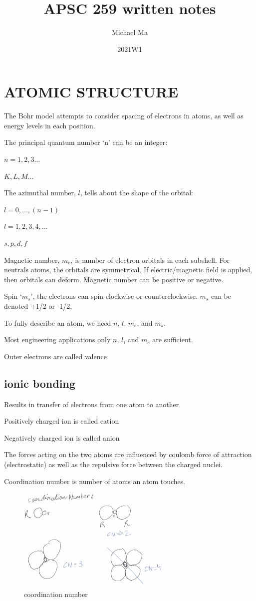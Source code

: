 \documentclass{article}
\title{APSC 259 written notes}
\author{Michael Ma}
\date{2021W1}
\begin{document}
\maketitle

\section{ATOMIC STRUCTURE}

The Bohr model attempts to consider spacing of electrons in atoms, as well as energy levels in each position.

The principal quantum number `n' can be an integer:

$n = 1, 2, 3 ...$
    
$    K, L, M ...$


The azimuthal number, $l$, tells about the shape of the orbital:

$l = 0, ..., (n-1)$

$l = 1, 2, 3, 4, ...$

$s, p, d, f$

Magnetic number, $m_e$, is number of electron orbitals in each subshell. For neutrals atoms, the orbitals are symmetrical. If electric/magnetic field is applied, then orbitals can deform. Magnetic number can be positive or negative.

Spin `$m_s$', the electrons can spin clockwise or counterclockwise. $m_s$ can be denoted +1/2 or -1/2. 

To fully describe an atom, we need $n$, $l$, $m_e$, and $m_s$.

Most engineering applications only $n$, $l$, and $m_e$ are sufficient.

Outer electrons are called valence

\subsection{ionic bonding}

Results in transfer of electrons from one atom to another

Positively charged ion is called cation

Negatively charged ion is called anion

The forces acting on the two atoms are influenced by coulomb force of attraction (electrostatic) as well as the repulsive force between the charged nuclei.

Coordination number is number of atoms an atom touches.
\begin{figure}[h!]
	\centering
	\includegraphics[width=0.66\textwidth]{assets/02394546.png}
	\caption{coordination number}
\end{figure}
\end{document}
